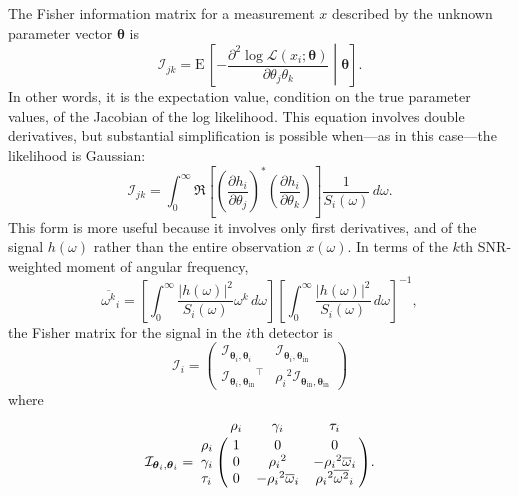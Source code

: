 \documentclass{iopart}
\begin{document}
The Fisher information matrix for a measurement $x$ described by the unknown parameter vector $\boldsymbol{\theta}$ is
%
\begin{equation}\label{eq:general-fisher-matrix}
	\mathcal{I}_{jk} = \mathrm{E} \, \left[
		-\frac{\partial^2 \log
			\mathcal{L}(x_i ; \boldsymbol\theta)}
			{\partial \theta_j \theta_k}
	\middle| \boldsymbol\theta
	\right].
\end{equation}
%
In other words, it is the expectation value, condition on the true parameter values, of the Jacobian of the log likelihood. This equation involves double derivatives, but substantial simplification is possible when---as in this case---the likelihood is Gaussian:
%
\begin{equation}\label{eq:gaussian-fisher-matrix}
	\mathcal{I}_{jk} = \int_0^\infty \Re \left[
        \left(\frac{\partial h_i}{\partial \theta_j}\right)^*
        \left(\frac{\partial h_i}{\partial \theta_k}\right)
	\right] \frac{1}{S_i(\omega)} \, d\omega.
\end{equation}
%
This form is more useful because it involves only first derivatives, and of the signal $h (\omega)$ rather than the entire observation $x (\omega)$. In terms of the $k$th \ac{SNR}-weighted moment of angular frequency,
%
\begin{equation}\label{eq:angular-frequency-moments}
    {\overline{\omega^k}}_i =
        \left[ \int_0^\infty \frac{|h (\omega)|^2}{S_i(\omega)} \omega^k \, d\omega \right]
        \left[ \int_0^\infty \frac{|h (\omega)|^2}{S_i(\omega)} \, d\omega \right]^{-1},
\end{equation}
%
the Fisher matrix for the signal in the $i$th detector is
%
\begin{equation}
	\mathcal{I}_i = \left(
		\begin{array}{cc}
			\mathcal{I}_{\boldsymbol\theta_i,\boldsymbol\theta_i} &
			\mathcal{I}_{\boldsymbol\theta_i,\boldsymbol\theta_\mathrm{in}} \\
			{\mathcal{I}_{\boldsymbol\theta_i,\boldsymbol\theta_\mathrm{in}}}^\intercal &
			{\rho_i}^2 \mathcal{I}_{\boldsymbol\theta_\mathrm{in},\boldsymbol\theta_\mathrm{in}}
		\end{array}
	\right)
\end{equation}
%
where
%
\begin{equation}\label{eq:fisher-matrix}
	\mathcal{I}_{\boldsymbol\theta_i,\boldsymbol\theta_i} = \bordermatrix{
        ~ & \rho_i & \gamma_i & \tau_i \cr
        \rho_i & 1 & 0 & 0 \cr
        \gamma_i & 0 & {\rho_i}^2 & -{\rho_i}^2 {\overline{\omega}}_i \cr
        \tau_i & 0 & -{\rho_i}^2 {\overline{\omega}}_i & {\rho_i}^2 {\overline{\omega^2}}_i
    }.
\end{equation}
\end{document}
